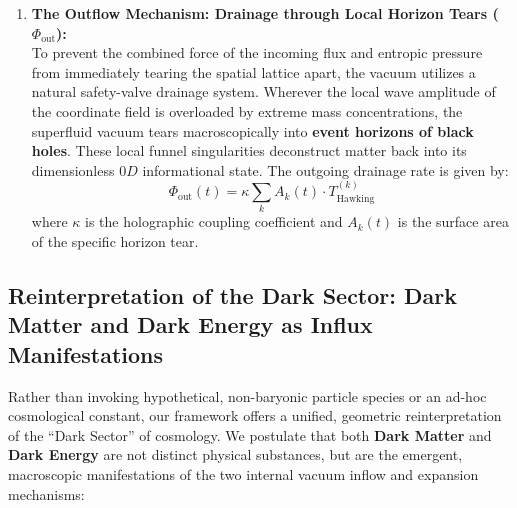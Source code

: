 \documentclass[11pt,a4paper]{article}
\theoremstyle{plain}
\theoremstyle{definition}
\theoremstyle{remark}
\begin{document}
\begin{enumerate}
    \item \textbf{The Outflow Mechanism: Drainage through Local Horizon Tears ($\Phi_{\text{out}}$):} \\
    To prevent the combined force of the incoming flux and entropic pressure from immediately tearing the spatial lattice apart, the vacuum utilizes a natural safety-valve drainage system. Wherever the local wave amplitude of the coordinate field is overloaded by extreme mass concentrations, the superfluid vacuum tears macroscopically into \textbf{event horizons of black holes}. These local funnel singularities deconstruct matter back into its dimensionless $0D$ informational state. The outgoing drainage rate is given by:
    \begin{equation}
    \Phi_{\text{out}}(t) = \kappa \sum_{k} A_k(t) \cdot T_{\text{Hawking}}^{(k)}
    \end{equation}
    where $\kappa$ is the holographic coupling coefficient and $A_k(t)$ is the surface area of the specific horizon tear.
\end{enumerate}
 
\newpage
\subsection{Reinterpretation of the Dark Sector: Dark Matter and Dark Energy as Influx Manifestations}
Rather than invoking hypothetical, non-baryonic particle species or an ad-hoc cosmological constant, our framework offers a unified, geometric reinterpretation of the ``Dark Sector'' of cosmology. We postulate that both \textbf{Dark Matter} and \textbf{Dark Energy} are not distinct physical substances, but are the emergent, macroscopic manifestations of the two internal vacuum inflow and expansion mechanisms:
\end{document}
